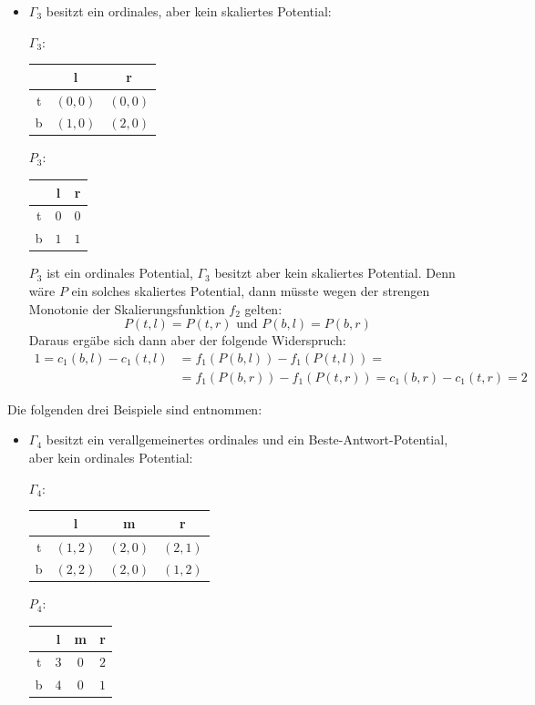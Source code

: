 \begin{bsp}
\begin{itemize}
		\item $\Gamma_3$ besitzt ein ordinales, aber kein skaliertes Potential:
			\begin{center}
				$\Gamma_3:$ \quad
				\begin{tabular}{c||c|c}
					& l 		& r 		\\\hline\hline
					t	& $(0,0)$	& $(0,0)$	\\\hline
					b	& $(1,0)$	& $(2,0)$ 
				\end{tabular}\hspace{5em}
				$P_3:$ \quad
				\begin{tabular}{c||c|c}
					& l 		& r 		\\\hline\hline
					t	& $0$	& $0$	\\\hline
					b	& $1$	& $1$ 
				\end{tabular}
			\end{center}
			$P_3$ ist ein ordinales Potential, $\Gamma_3$ besitzt aber kein skaliertes Potential. Denn wäre $P$ ein solches skaliertes Potential, dann müsste wegen der strengen Monotonie der Skalierungsfunktion $f_2$ gelten:
				\[P(t,l) = P(t,r) \text{ und } P(b,l) = P(b,r)\]
			Daraus ergäbe sich dann aber der folgende Widerspruch:
				\begin{align*}
					1 = c_1(b,l)-c_1(t,l) 	&= f_1(P(b,l)) - f_1(P(t,l)) = \\
											&= f_1(P(b,r)) - f_1(P(t,r)) = c_1(b,r) - c_1(t,r) = 2
				\end{align*}
	\end{itemize}
	Die folgenden drei Beispiele sind \cite[Beispiele 4.1, 4.2 und 4.3]{BestRespPot} entnommen:
	\begin{itemize}
		\item $\Gamma_4$ besitzt ein verallgemeinertes ordinales und ein Beste-Antwort-Potential, aber kein ordinales Potential:
			\begin{center}
				$\Gamma_4:$ \quad
				\begin{tabular}{c||c|c|c}
						& l 		& m			& r 		\\\hline\hline
					t	& $(1,2)$	& $(2,0)$ 	& $(2,1)$	\\\hline
					b	& $(2,2)$	& $(2,0)$	& $(1,2)$
				\end{tabular}\hspace{5em}
				$P_4:$ \quad
				\begin{tabular}{c||c|c|c}
						& l 		& m 		& r \\\hline\hline
					t	& $3$	& $0$ 		& $2$	\\\hline
					b	& $4$	& $0$		& $1$

\end{tabular}
\end{center}
\end{itemize}
\end{bsp}
